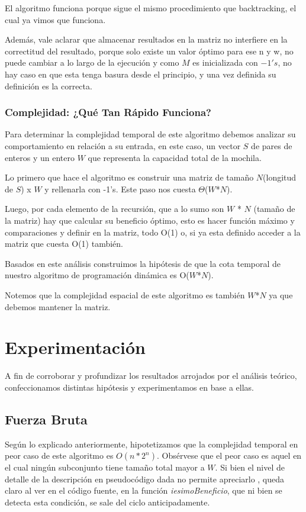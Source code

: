 \documentclass[a4paper]{article}
\begin{document}
El algoritmo funciona porque sigue el mismo procedimiento que backtracking, el cual ya vimos que funciona.

Además, vale aclarar que almacenar resultados en la matriz no interfiere en la correctitud del resultado, porque solo existe un valor óptimo para ese n y w, no puede cambiar a lo largo de la ejecución y como $M$ es inicializada con $-1's$, no hay caso en que esta tenga basura desde el principio, y una vez definida su definición es la correcta.

\subsubsection{Complejidad: ¿Qué Tan Rápido Funciona?}

Para determinar la complejidad temporal de este algoritmo debemos analizar su comportamiento en relación a su entrada, en este caso, un vector $S$ de pares de enteros y un entero $W$ que representa la capacidad total de la mochila.

Lo primero que hace el algoritmo es construir una matriz de tamaño $N$(longitud de $S$) x $W$ y rellenarla con -1's. Este paso nos cuesta $\Theta$($W$*$N$).

Luego, por cada elemento de la recursión, que a lo sumo son $W$ * $N$ (tamaño de la matriz) hay que calcular su beneficio óptimo, esto es hacer función máximo y comparaciones y definir en la matriz, todo O(1) o, si ya esta definido acceder a la matriz que cuesta O(1) también.

Basados en este análisis construimos la hipótesis de que la cota temporal de nuestro algoritmo de programación dinámica es O($W$*$N$).

Notemos que la complejidad espacial de este algoritmo es también $W$*$N$ ya que debemos mantener la matriz.



\section{Experimentación} 
%
A fin de corroborar y profundizar los resultados arrojados por el análisis teórico, confeccionamos distintas hipótesis y experimentamos en base a ellas. 

\subsection{Fuerza Bruta} 
Según lo explicado anteriormente, hipotetizamos que la complejidad temporal en peor caso de este algoritmo es $O(n*2^n)$. Obsérvese que el peor caso es aquel en el cual ningún subconjunto tiene tamaño total mayor a $W$. Si bien el nivel de detalle de la descripción en pseudocódigo dada no permite apreciarlo , queda claro al ver en el código fuente, en la función \textit{iesimoBeneficio}, que ni bien se detecta esta condición, se sale del ciclo anticipadamente. 
\end{document}
